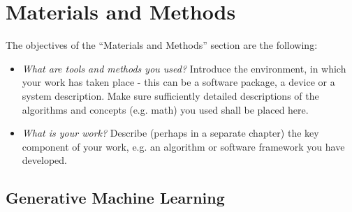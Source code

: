 %
\newpage
\chapter{Materials and Methods}
The objectives of the ``Materials and Methods'' section are the following:
\begin{itemize}
    \item \textit{What are tools and methods you used?} Introduce the environment, in which your work has taken place - this can be a software package, a device or a system description. Make sure sufficiently detailed descriptions of the algorithms and concepts (e.g. math) you used shall be placed here.
    \item \textit{What is your work?} Describe (perhaps in a separate chapter) the key component of your work, e.g. an algorithm or software framework you have developed.
\end{itemize}


\section{Generative Machine Learning}
